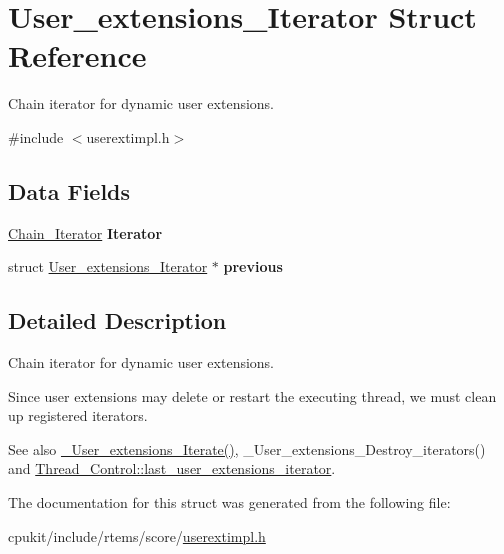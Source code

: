 \hypertarget{structUser__extensions__Iterator}{}\section{User\+\_\+extensions\+\_\+\+Iterator Struct Reference}
\label{structUser__extensions__Iterator}


Chain iterator for dynamic user extensions.  




{\ttfamily \#include $<$userextimpl.\+h$>$}

\subsection*{Data Fields}
\begin{DoxyCompactItemize}
\item 
\mbox{\label{structUser__extensions__Iterator_a05f211d0359a56640cba9a25a4058a46}} 
\mbox{\hyperlink{structChain__Iterator}{Chain\+\_\+\+Iterator}} {\bfseries Iterator}
\item 
\mbox{\label{structUser__extensions__Iterator_acd3d8d018ed834653b5c01d9a55bc5b4}} 
struct \mbox{\hyperlink{structUser__extensions__Iterator}{User\+\_\+extensions\+\_\+\+Iterator}} $\ast$ {\bfseries previous}
\end{DoxyCompactItemize}


\subsection{Detailed Description}
Chain iterator for dynamic user extensions. 

Since user extensions may delete or restart the executing thread, we must clean up registered iterators.

\begin{DoxySeeAlso}{See also}
\mbox{\hyperlink{group__RTEMSScoreUserExt_ga1246f6873da0a4fae3dd8e8e3b41324b}{\+\_\+\+User\+\_\+extensions\+\_\+\+Iterate()}}, \+\_\+\+User\+\_\+extensions\+\_\+\+Destroy\+\_\+iterators() and \mbox{\hyperlink{struct__Thread__Control_a18a1b23d5aaaa58ccbba691990b64feb}{Thread\+\_\+\+Control\+::last\+\_\+user\+\_\+extensions\+\_\+iterator}}. 
\end{DoxySeeAlso}


The documentation for this struct was generated from the following file\+:\begin{DoxyCompactItemize}
\item 
cpukit/include/rtems/score/\mbox{\hyperlink{userextimpl_8h}{userextimpl.\+h}}\end{DoxyCompactItemize}
